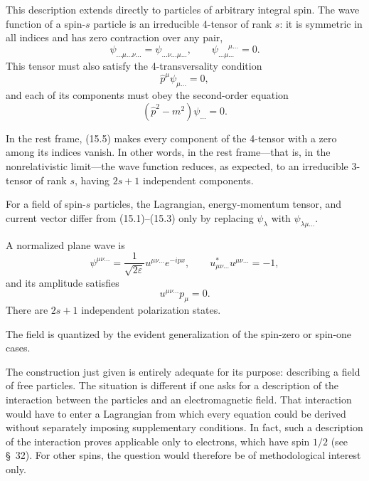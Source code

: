 This description extends directly to particles of arbitrary integral spin. The wave function of a spin-$s$ particle is an irreducible 4-tensor of rank $s$: it is symmetric in all indices and has zero contraction over any pair,
\begin{equation}
\psi_{\ldots\mu\ldots\nu\ldots}
=\psi_{\ldots\nu\ldots\mu\ldots},
\qquad
\psi_{\ldots\mu\ldots}^{\phantom{\ldots\mu}\mu\ldots}=0.
\tag{15.4}
\end{equation}
This tensor must also satisfy the 4-transversality condition
\begin{equation}
\widehat p^\mu\psi_{\mu\ldots}=0,
\tag{15.5}
\end{equation}
and each of its components must obey the second-order equation
\begin{equation}
(\widehat p^2-m^2)\psi_{\ldots}=0.
\tag{15.6}
\end{equation}

In the rest frame, (15.5) makes every component of the 4-tensor with a zero among its indices vanish. In other words, in the rest frame---that is, in the nonrelativistic limit---the wave function reduces, as expected, to an irreducible 3-tensor of rank $s$, having $2s+1$ independent components.

For a field of spin-$s$ particles, the Lagrangian, energy-momentum tensor, and current vector differ from (15.1)--(15.3) only by replacing $\psi_\lambda$ with $\psi_{\lambda\mu\ldots}$.

A normalized plane wave is
\begin{equation}
\psi^{\mu\nu\ldots}
=\frac{1}{\sqrt{2\varepsilon}}u^{\mu\nu\ldots}e^{-ipx},
\qquad
u^*_{\mu\nu\ldots}u^{\mu\nu\ldots}=-1,
\tag{15.7}
\end{equation}
and its amplitude satisfies
\begin{equation}
u^{\mu\nu\ldots}p_\mu=0.
\tag{15.8}
\end{equation}
There are $2s+1$ independent polarization states.

The field is quantized by the evident generalization of the spin-zero or spin-one cases.

The construction just given is entirely adequate for its purpose: describing a field of free particles. The situation is different if one asks for a description of the interaction between the particles and an electromagnetic field. That interaction would have to enter a Lagrangian from which every equation could be derived without separately imposing supplementary conditions. In fact, such a description of the interaction proves applicable only to electrons, which have spin $1/2$ (see \S~32). For other spins, the question would therefore be of methodological interest only.

